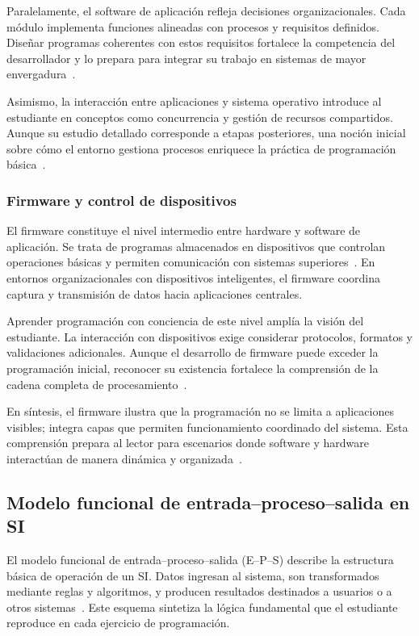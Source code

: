 \documentclass[12pt,twoside]{book}
\begin{document}
						Paralelamente, el software de aplicación refleja decisiones organizacionales. Cada módulo implementa funciones alineadas con procesos y requisitos definidos. Diseñar programas coherentes con estos requisitos fortalece la competencia del desarrollador y lo prepara para integrar su trabajo en sistemas de mayor envergadura~\cite{Kendall2014Systems,Tegarden2025Systems,Pressman2019Software}.
						
						Asimismo, la interacción entre aplicaciones y sistema operativo introduce al estudiante en conceptos como concurrencia y gestión de recursos compartidos. Aunque su estudio detallado corresponde a etapas posteriores, una noción inicial sobre cómo el entorno gestiona procesos enriquece la práctica de programación básica~\cite{Silberschatz2018Operating,Sommerville2015Software,Tanenbaum2021Structured}.
						
					\subsubsection{Firmware y control de dispositivos}
						\noindent
						El firmware constituye el nivel intermedio entre hardware y software de aplicación. Se trata de programas almacenados en dispositivos que controlan operaciones básicas y permiten comunicación con sistemas superiores~\cite{Tanenbaum2021Structured,Laudon2020Management}. En entornos organizacionales con dispositivos inteligentes, el firmware coordina captura y transmisión de datos hacia aplicaciones centrales.
						
						Aprender programación con conciencia de este nivel amplía la visión del estudiante. La interacción con dispositivos exige considerar protocolos, formatos y validaciones adicionales. Aunque el desarrollo de firmware puede exceder la programación inicial, reconocer su existencia fortalece la comprensión de la cadena completa de procesamiento~\cite{Ghezzi2003Fundamentals,Sommerville2015Software,Tegarden2025Systems}.
						
						En síntesis, el firmware ilustra que la programación no se limita a aplicaciones visibles; integra capas que permiten funcionamiento coordinado del sistema. Esta comprensión prepara al lector para escenarios donde software y hardware interactúan de manera dinámica y organizada~\cite{Laudon2020Management,Tanenbaum2021Structured,Kendall2014Systems}.
						
				\subsection{Modelo funcional de entrada–proceso–salida en SI}
					\noindent
					El modelo funcional de entrada–proceso–salida (E–P–S) describe la estructura básica de operación de un SI. Datos ingresan al sistema, son transformados mediante reglas y algoritmos, y producen resultados destinados a usuarios o a otros sistemas~\cite{Laudon2020Management,Kendall2014Systems}. Este esquema sintetiza la lógica fundamental que el estudiante reproduce en cada ejercicio de programación.
					
\end{document}
